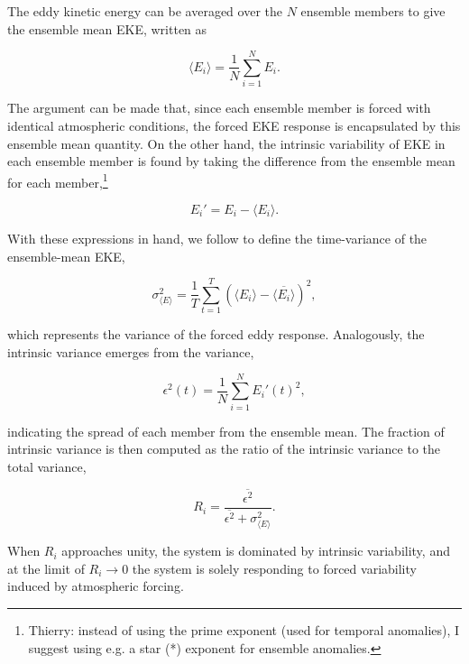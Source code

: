 \documentclass{agujournal2019}
\begin{document}
The eddy kinetic energy can be averaged over the $N$ ensemble members to give the ensemble mean EKE, written as
\begin{linenomath*}
\begin{equation}
\langle E_i \rangle = \frac{1}{N} \sum_{i=1}^N E_i.
\end{equation}
\end{linenomath*}
The argument can be made that, since each ensemble member is forced with identical atmospheric conditions, the forced EKE response is encapsulated by this ensemble mean quantity.
On the other hand, the intrinsic variability of EKE in each ensemble member is found by taking the difference from the ensemble mean for each member,\footnote{{\color{red}Thierry: instead of using the prime exponent (used for temporal anomalies), I suggest using e.g. a star (*) exponent for ensemble anomalies.}}
\begin{linenomath*}
\begin{equation}
E_i' = E_i - \langle E_i \rangle.
\end{equation}
\end{linenomath*}
With these expressions in hand, we follow \citet{Leroux2018} to define the  time-variance of the ensemble-mean EKE,
\begin{linenomath*}
\begin{equation}
\sigma^2_{\langle E \rangle} = \frac{1}{T} \sum_{t=1}^T \left(\langle E_i \rangle -  \overline{\langle E_i \rangle}\right)^2,
\end{equation}
\end{linenomath*}
which represents the variance of the forced eddy response.
Analogously, the intrinsic variance emerges from the variance,
\begin{linenomath*}
\begin{equation}
\epsilon^2(t) = \frac{1}{N} \sum_{i=1}^N E_i'(t)^2,
\end{equation}
\end{linenomath*}
indicating the spread of each member from the ensemble mean.
The fraction of intrinsic variance is then computed as the ratio of the intrinsic variance to the total variance,
\begin{linenomath*}
\begin{equation}
R_i =  \frac{\overline{\epsilon^2}}{\overline{\epsilon^2} + \sigma^2_{\langle E \rangle}}.
\end{equation}
\end{linenomath*}
When $R_i$ approaches unity, the system is dominated by intrinsic variability, and at the limit  of $R_i \to 0$ the system is solely responding to forced variability induced by atmospheric forcing.
\end{document}
